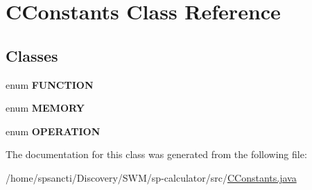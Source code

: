 \hypertarget{class_c_constants}{}\section{C\+Constants Class Reference}
\label{class_c_constants}
\subsection*{Classes}
\begin{DoxyCompactItemize}
\item 
enum {\bfseries F\+U\+N\+C\+T\+I\+ON}
\item 
enum {\bfseries M\+E\+M\+O\+RY}
\item 
enum {\bfseries O\+P\+E\+R\+A\+T\+I\+ON}
\end{DoxyCompactItemize}


The documentation for this class was generated from the following file\+:\begin{DoxyCompactItemize}
\item 
/home/spsancti/\+Discovery/\+S\+W\+M/sp-\/calculator/src/\hyperlink{_c_constants_8java}{C\+Constants.\+java}\end{DoxyCompactItemize}
